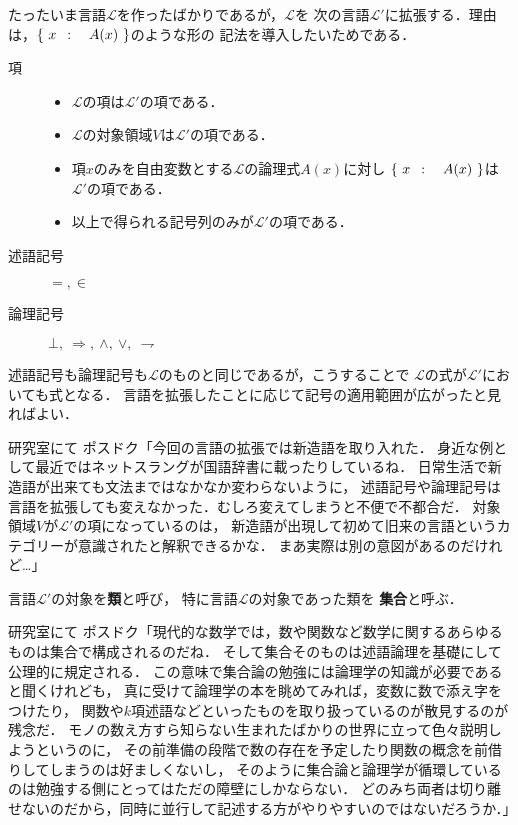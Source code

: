 	たったいま言語$\mathcal{L}$を作ったばかりであるが，$\mathcal{L}$を
	次の言語$\mathcal{L}'$に拡張する．理由は，$\left\{\ x\ \, : \quad A(x)\ \right\}$のような形の
	記法を導入したいためである．
	\begin{description}
		\item[項] 
			\begin{itemize}
				\item $\mathcal{L}$の項は$\mathcal{L}'$の項である．
				\item $\mathcal{L}$の対象領域$V$は$\mathcal{L}'$の項である．
				\item 項$x$のみを自由変数とする$\mathcal{L}$の論理式$A(x)$に対し
					$\left\{\ x\ \, : \quad A(x)\ \right\}$は$\mathcal{L}'$の項である．
				\item 以上で得られる記号列のみが$\mathcal{L}'$の項である．
			\end{itemize}
			
		\item[述語記号] $=,\in$
		\item[論理記号] $\bot,\ \Longrightarrow,\ \wedge,\ \vee,\ \rightharpoondown$
	\end{description}
	
	述語記号も論理記号も$\mathcal{L}$のものと同じであるが，こうすることで
	$\mathcal{L}$の式が$\mathcal{L}'$においても式となる．
	言語を拡張したことに応じて記号の適用範囲が広がったと見ればよい．
	
	\begin{itembox}[l]{研究室にて}
		ポスドク「今回の言語の拡張では新造語を取り入れた．
			身近な例として最近ではネットスラングが国語辞書に載ったりしているね．
			日常生活で新造語が出来ても文法まではなかなか変わらないように，
			述語記号や論理記号は言語を拡張しても変えなかった．むしろ変えてしまうと不便で不都合だ．
			対象領域$V$が$\mathcal{L}'$の項になっているのは，
			新造語が出現して初めて旧来の言語というカテゴリーが意識されたと解釈できるかな．
			まあ実際は別の意図があるのだけれど…」
	\end{itembox}
	
	\begin{screen}
		\begin{dfn}[類・集合]
			言語$\mathcal{L}'$の対象を{\bf 類}と呼び，
			特に言語$\mathcal{L}$の対象であった類を
			{\bf 集合}と呼ぶ．
		\end{dfn}
	\end{screen}
	
	\begin{itembox}[l]{研究室にて}
		ポスドク「現代的な数学では，数や関数など数学に関するあらゆるものは集合で構成されるのだね．
		そして集合そのものは述語論理を基礎にして公理的に規定される．
		この意味で集合論の勉強には論理学の知識が必要であると聞くけれども，
		真に受けて論理学の本を眺めてみれば，変数に数で添え字をつけたり，
		関数や$k$項述語などといったものを取り扱っているのが散見するのが残念だ．
		モノの数え方すら知らない生まれたばかりの世界に立って色々説明しようというのに，
		その前準備の段階で数の存在を予定したり関数の概念を前借りしてしまうのは好ましくないし，
		そのように集合論と論理学が循環しているのは勉強する側にとってはただの障壁にしかならない．
		どのみち両者は切り離せないのだから，同時に並行して記述する方がやりやすいのではないだろうか．」
	\end{itembox}
	
